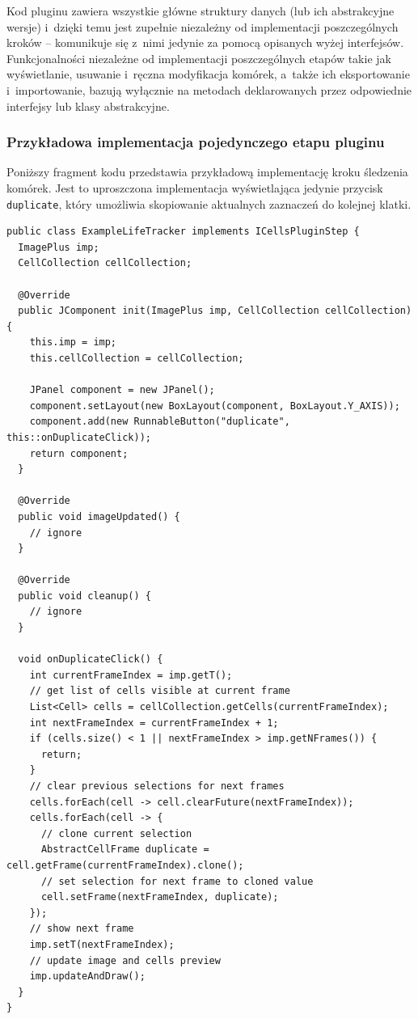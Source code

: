 \documentclass[declaration,shortabstract,mgr]{iithesis}
\begin{document}
Kod pluginu zawiera wszystkie główne struktury danych (lub ich abstrakcyjne wersje) i~dzięki temu jest zupełnie niezależny od implementacji poszczególnych kroków -- komunikuje się z~nimi jedynie za pomocą opisanych wyżej interfejsów.
Funkcjonalności niezależne od implementacji poszczególnych etapów takie jak wyświetlanie, usuwanie i~ręczna modyfikacja komórek, a~także ich eksportowanie i~importowanie, bazują wyłącznie na metodach deklarowanych przez odpowiednie interfejsy lub klasy abstrakcyjne.

\subsubsection{Przykładowa implementacja pojedynczego etapu pluginu}

Poniższy fragment kodu przedstawia przykładową implementację kroku śledzenia komórek.
Jest to uproszczona implementacja wyświetlająca jedynie przycisk \texttt{duplicate}, który umożliwia skopiowanie aktualnych zaznaczeń do kolejnej klatki.

\par\bigskip

\begin{lstlisting}
public class ExampleLifeTracker implements ICellsPluginStep {
  ImagePlus imp;
  CellCollection cellCollection;

  @Override
  public JComponent init(ImagePlus imp, CellCollection cellCollection) {
    this.imp = imp;
    this.cellCollection = cellCollection;

    JPanel component = new JPanel();
    component.setLayout(new BoxLayout(component, BoxLayout.Y_AXIS));
    component.add(new RunnableButton("duplicate", this::onDuplicateClick));
    return component;
  }

  @Override
  public void imageUpdated() {
    // ignore
  }

  @Override
  public void cleanup() {
    // ignore
  }

  void onDuplicateClick() {
    int currentFrameIndex = imp.getT();
    // get list of cells visible at current frame
    List<Cell> cells = cellCollection.getCells(currentFrameIndex);
    int nextFrameIndex = currentFrameIndex + 1;
    if (cells.size() < 1 || nextFrameIndex > imp.getNFrames()) {
      return;
    }
    // clear previous selections for next frames
    cells.forEach(cell -> cell.clearFuture(nextFrameIndex));
    cells.forEach(cell -> {
      // clone current selection
      AbstractCellFrame duplicate = cell.getFrame(currentFrameIndex).clone();
      // set selection for next frame to cloned value
      cell.setFrame(nextFrameIndex, duplicate);
    });
    // show next frame
    imp.setT(nextFrameIndex);
    // update image and cells preview
    imp.updateAndDraw();
  }
}
\end{lstlisting}
\end{document}
